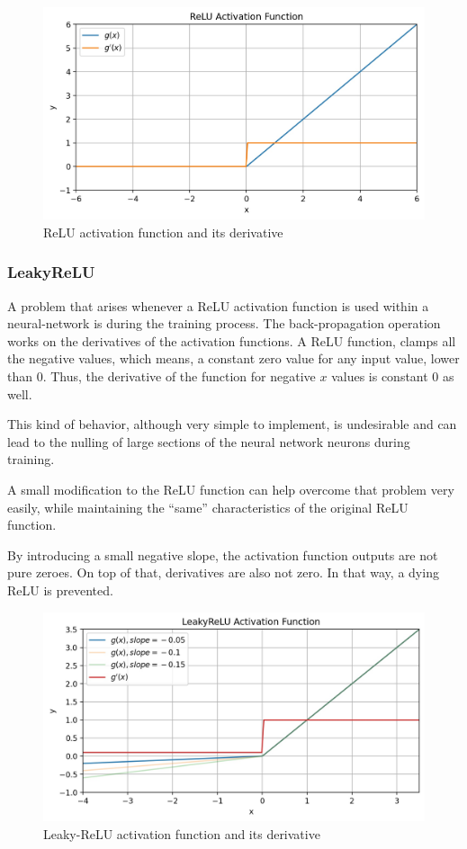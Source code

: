 \begin{figure}[H]
    \centering
    \includegraphics[width=0.75\linewidth]{ANN/images/relu}
    \caption{ReLU activation function and its derivative}\label{fig:relu_af}
\end{figure}

% 

\subsubsection{LeakyReLU}
A problem that arises whenever a
ReLU activation function is used within a neural-network
is during the training process.
The back-propagation operation
works on the derivatives of the activation functions.
A ReLU function, clamps all the negative values,
which means, a constant zero value for any input value,
lower than 0. Thus, the derivative of the function
for negative \(x\) values is constant 0 as well.

This kind of behavior, although very simple to implement,
is undesirable and can lead to the nulling of large
sections of the neural network neurons during training.

A small modification to the
ReLU function can help overcome that
problem very easily, while maintaining
the ``same'' characteristics of the
original ReLU function.

By introducing a small negative slope,
the activation function outputs are not pure zeroes.
On top of that, derivatives are also not zero. In that
way, a dying ReLU is prevented.

\begin{figure}[H]
    \centering
    \includegraphics[width=0.75\linewidth]{ANN/images/leakyrelu}
    \caption{Leaky-ReLU activation function and its derivative}\label{fig:leakyrelu_af}
\end{figure}

